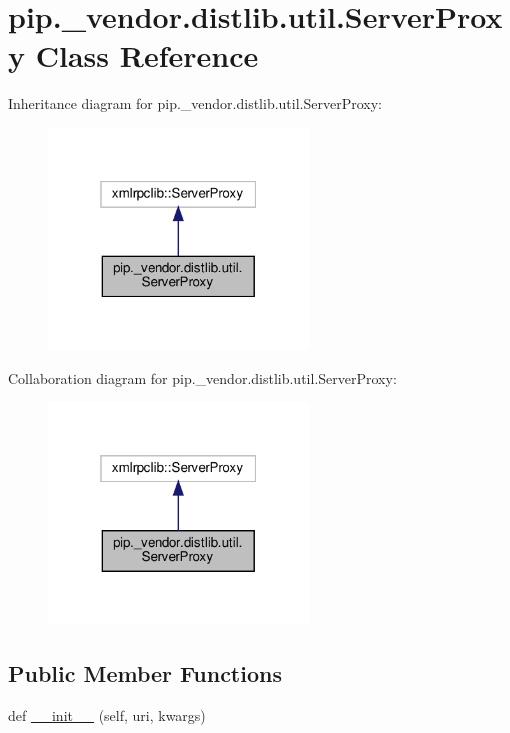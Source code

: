 \hypertarget{classpip_1_1__vendor_1_1distlib_1_1util_1_1ServerProxy}{}\section{pip.\+\_\+vendor.\+distlib.\+util.\+Server\+Proxy Class Reference}
\label{classpip_1_1__vendor_1_1distlib_1_1util_1_1ServerProxy}


Inheritance diagram for pip.\+\_\+vendor.\+distlib.\+util.\+Server\+Proxy\+:
\nopagebreak
\begin{figure}[H]
\begin{center}
\leavevmode
\includegraphics[width=196pt]{classpip_1_1__vendor_1_1distlib_1_1util_1_1ServerProxy__inherit__graph}
\end{center}
\end{figure}


Collaboration diagram for pip.\+\_\+vendor.\+distlib.\+util.\+Server\+Proxy\+:
\nopagebreak
\begin{figure}[H]
\begin{center}
\leavevmode
\includegraphics[width=196pt]{classpip_1_1__vendor_1_1distlib_1_1util_1_1ServerProxy__coll__graph}
\end{center}
\end{figure}
\subsection*{Public Member Functions}
\begin{DoxyCompactItemize}
\item 
def \hyperlink{classpip_1_1__vendor_1_1distlib_1_1util_1_1ServerProxy_a082893a59c2b6f6aa46076f9303b5c20}{\+\_\+\+\_\+init\+\_\+\+\_\+} (self, uri, kwargs)
\end{DoxyCompactItemize}
